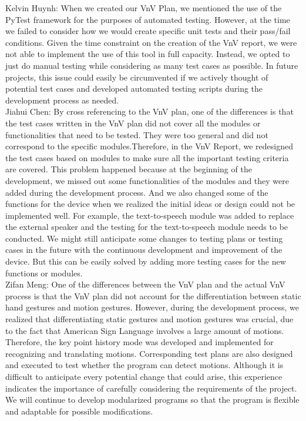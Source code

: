 \documentclass[12pt, titlepage]{article}
\begin{document}
\begin{enumerate}
  Kelvin Huynh: When we created our VnV Plan, we mentioned the use of the PyTest framework for 
  the purposes of automated testing. However, at the time we failed to consider how we would create 
  specific unit tests and their pass/fail conditions. Given the time constraint on the creation of the 
  VnV report, we were not able to implement the use of this tool in full capacity. Instead, we opted to 
  just do manual testing while considering as many test cases as possible. In future projects, this issue 
  could easily be circumvented if we actively thought of potential test cases and developed automated testing 
  scripts during the development process as needed.\\
  
  Jiahui Chen: By cross referencing to the VnV plan, one of the differences is that the test cases written in the VnV plan did not cover all the modules or functionalities that need to be tested. They were too general and did not correspond to the specific modules.Therefore, in the VnV Report, we redesigned the test cases based on modules to make sure all the important testing criteria are covered. This problem happened because at the beginning of the development, we missed out some functionalities of the modules and they were added during the development process. And we also changed some of the functions for the device when we realized the initial ideas or design could not be implemented well. For example, the text-to-speech module was added to replace the external speaker and the testing for the text-to-speech module needs to be conducted. We might still anticipate some changes to testing plans or testing cases in the future with the continuous development and improvement of the device. But this can be easily solved by adding more testing cases for the new functions or modules.\\

  Zifan Meng: One of the differences between the VnV plan and the actual VnV process is that the VnV plan did not  account for the differentiation between static hand gestures and motion gestures. However, during the development process, we realized that differentiating static gestures and motion gestures was crucial, due to the fact that American Sign Language involves a large amount of motions. Therefore, the key point history mode was developed and implemented for recognizing and translating motions. Corresponding test plans are also designed and executed to test whether the program can detect motions. Although it is difficult to anticipate every potential change that could arise, this experience indicates the importance of carefully considering the requirements of the project. We will continue to develop modularized programs so that the program is flexible and adaptable for possible modifications.\\
  

\end{enumerate}
\end{document}
